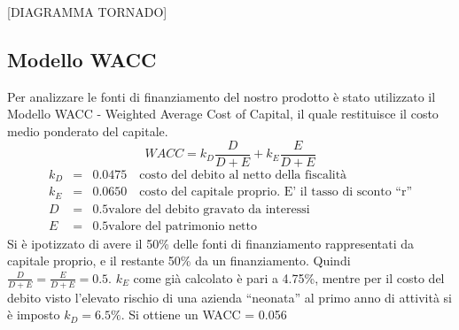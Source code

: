 
[DIAGRAMMA TORNADO]
\subsection{Modello WACC}
Per analizzare le fonti di finanziamento del nostro prodotto è stato utilizzato
il Modello WACC - Weighted Average Cost of Capital, il quale restituisce il
costo medio ponderato del capitale.
\begin{displaymath}
WACC = k_D \frac{D}{D+E} + k_E \frac{E}{D+E}
\end{displaymath}
\begin{eqnarray*}
k_D &=& 0.0475 \quad \mbox{costo del debito al netto della fiscalità} \\
k_E &=& 0.0650 \quad \mbox{costo del capitale proprio. E’ il tasso di sconto “r”} \\
D &=& 0.5 \mbox{valore del debito gravato da interessi} \\
E &=& 0.5 \mbox{valore del patrimonio netto} 
\end{eqnarray*}
Si è ipotizzato di avere il 50\% delle fonti di finanziamento rappresentati da
capitale proprio, e il restante 50\% da un finanziamento. Quindi $\frac{D}{D+E} 
= \frac{E}{D+E} = 0.5$.  $k_E$ come già calcolato è pari a 4.75\%, mentre per il
costo del debito visto l’elevato rischio di una azienda “neonata” al primo anno
di attività si è imposto $k_D = 6.5\%$. 
Si ottiene un WACC = 0.056
